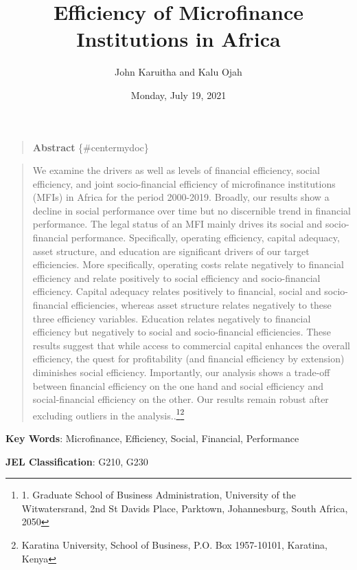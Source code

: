 \documentclass[
]{article}
\title{Efficiency of Microfinance Institutions in Africa}
\author{John Karuitha and Kalu Ojah}
\date{Monday, July 19, 2021}
\begin{document}
\maketitle

{
\setcounter{tocdepth}{4}
\tableofcontents
}
\newpage

\begin{quote}
\textbf{Abstract} \{\#centermydoc\}
\end{quote}

\begin{quote}
We examine the drivers as well as levels of financial efficiency, social
efficiency, and joint socio-financial efficiency of microfinance
institutions (MFIs) in Africa for the period 2000-2019. Broadly, our
results show a decline in social performance over time but no
discernible trend in financial performance. The legal status of an MFI
mainly drives its social and socio-financial performance. Specifically,
operating efficiency, capital adequacy, asset structure, and education
are significant drivers of our target efficiencies. More specifically,
operating costs relate negatively to financial efficiency and relate
positively to social efficiency and socio-financial efficiency. Capital
adequacy relates positively to financial, social and socio-financial
efficiencies, whereas asset structure relates negatively to these three
efficiency variables. Education relates negatively to financial
efficiency but negatively to social and socio-financial efficiencies.
These results suggest that while access to commercial capital enhances
the overall efficiency, the quest for profitability (and financial
efficiency by extension) diminishes social efficiency. Importantly, our
analysis shows a trade-off between financial efficiency on the one hand
and social efficiency and social-financial efficiency on the other. Our
results remain robust after excluding outliers in the
analysis..\footnote{1. Graduate School of Business Administration,
  University of the Witwatersrand, 2nd St Davids Place, Parktown,
  Johannesburg, South Africa, 2050}\footnote{Karatina University, School
  of Business, P.O. Box 1957-10101, Karatina, Kenya}
\end{quote}

\vspace{10mm}

\textbf{Key Words}: Microfinance, Efficiency, Social, Financial,
Performance

\vspace{5mm}

\textbf{JEL Classification}: G210, G230
\end{document}
